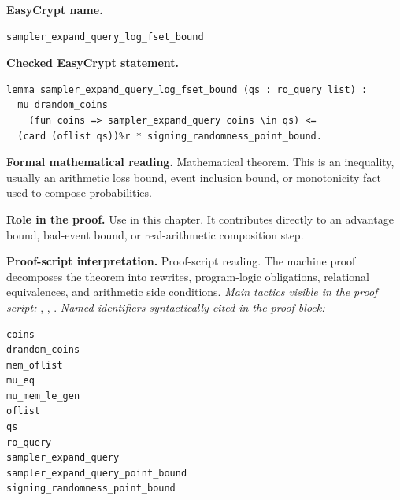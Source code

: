 \begin{formaltheorem}
\noindent\textbf{EasyCrypt name.}
\begin{lstlisting}[language=EasyCrypt,basicstyle=\ttfamily\scriptsize]
sampler_expand_query_log_fset_bound
\end{lstlisting}
\noindent\textbf{Checked EasyCrypt statement.}
\begin{lstlisting}[language=EasyCrypt,basicstyle=\ttfamily\scriptsize]
lemma sampler_expand_query_log_fset_bound (qs : ro_query list) :
  mu drandom_coins
    (fun coins => sampler_expand_query coins \in qs) <=
  (card (oflist qs))%r * signing_randomness_point_bound.
\end{lstlisting}
\noindent\textbf{Formal mathematical reading.}
Mathematical theorem. This is an inequality, usually an arithmetic loss bound, event inclusion bound, or monotonicity fact used to compose probabilities.

\noindent\textbf{Role in the proof.}
Use in this chapter. It contributes directly to an advantage bound, bad-event bound, or real-arithmetic composition step.

\noindent\textbf{Proof-script interpretation.}
Proof-script reading. The machine proof decomposes the theorem into rewrites, program-logic obligations, relational equivalences, and arithmetic side conditions.
\emph{Main tactics visible in the proof script:} , , .
\emph{Named identifiers syntactically cited in the proof block:}
\begin{lstlisting}[language=EasyCrypt,basicstyle=\ttfamily\scriptsize]
coins
drandom_coins
mem_oflist
mu_eq
mu_mem_le_gen
oflist
qs
ro_query
sampler_expand_query
sampler_expand_query_point_bound
signing_randomness_point_bound
\end{lstlisting}

\end{formaltheorem}

